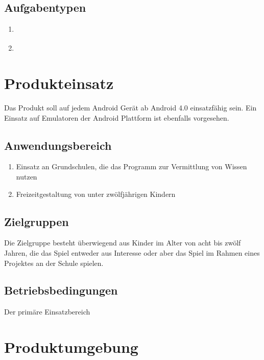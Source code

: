 \documentclass{scrartcl}
\begin{document}
\subsection{Aufgabentypen}

\begin{enumerate}
	\item \label{aufgabentyp:puzzle}
	\item \label{aufgabentyp:fehlerfindung}
\end{enumerate}

\clearpage

\section{Produkteinsatz}

Das Produkt soll auf jedem Android Gerät ab Android 4.0 einsatzfähig sein. Ein Einsatz auf Emulatoren der Android Plattform ist ebenfalls vorgesehen.

\subsection{Anwendungsbereich}

\begin{enumerate}
	\item Einsatz an Grundschulen, die das Programm zur Vermittlung von Wissen nutzen
	\item Freizeitgestaltung von unter zwölfjährigen Kindern
\end{enumerate}

\subsection{Zielgruppen}

Die Zielgruppe besteht überwiegend aus Kinder im Alter von acht bis zwölf Jahren, die das Spiel entweder aus Interesse oder aber das Spiel im Rahmen eines Projektes an der Schule spielen.

\subsection{Betriebsbedingungen}

Der primäre Einsatzbereich 

\clearpage

\section{Produktumgebung}
\end{document}
